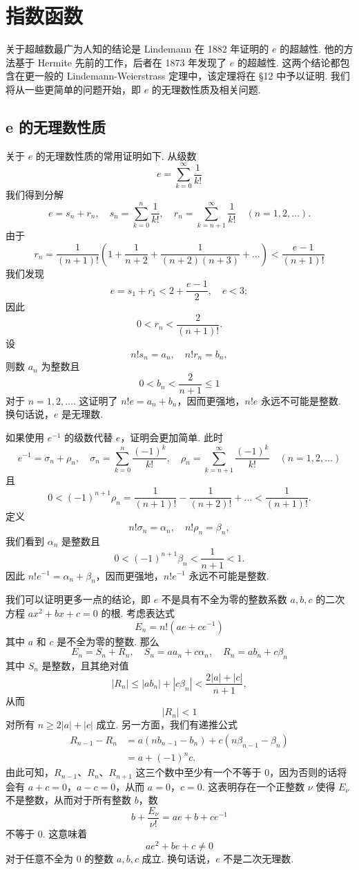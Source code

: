 \chapter{指数函数}

关于超越数最广为人知的结论是 Lindemann 在 1882 年证明的 $e$ 的超越性. 他的方法基于 Hermite 先前的工作，后者在 1873 年发现了 $e$ 的超越性. 这两个结论都包含在更一般的 Lindemann-Weierstrass 定理中，该定理将在 \S 12 中予以证明. 我们将从一些更简单的问题开始，即 $e$ 的无理数性质及相关问题.

\section{e 的无理数性质}

关于 $e$ 的无理数性质的常用证明如下. 从级数
\[ e = \sum_{k=0}^{\infty} \frac{1}{k!} \]
我们得到分解
\[ e = s_n + r_n, \quad s_n = \sum_{k=0}^{n} \frac{1}{k!}, \quad r_n = \sum_{k=n+1}^{\infty} \frac{1}{k!} \quad (n=1, 2, \dots). \]
由于
\[ r_n = \frac{1}{(n+1)!} \left( 1 + \frac{1}{n+2} + \frac{1}{(n+2)(n+3)} + \dots \right) < \frac{e-1}{(n+1)!} \]
我们发现
\[ e = s_1 + r_1 < 2 + \frac{e-1}{2}, \quad e < 3; \]
因此
\[ 0 < r_n < \frac{2}{(n+1)!}. \]
设
\[ n! s_n = a_n, \quad n! r_n = b_n, \]
则数 $a_n$ 为整数且
\[ 0 < b_n < \frac{2}{n+1} \le 1 \]
对于 $n=1, 2, \dots$. 这证明了 $n! e = a_n + b_n$，因而更强地，$n! e$ 永远不可能是整数. 换句话说，$e$ 是无理数.

如果使用 $e^{-1}$ 的级数代替 $e$，证明会更加简单. 此时
\[ e^{-1} = \sigma_n + \rho_n, \quad \sigma_n = \sum_{k=0}^{n} \frac{(-1)^k}{k!}, \quad \rho_n = \sum_{k=n+1}^{\infty} \frac{(-1)^k}{k!} \quad (n=1, 2, \dots) \]
且
\[ 0 < (-1)^{n+1} \rho_n = \frac{1}{(n+1)!} - \frac{1}{(n+2)!} + \dots < \frac{1}{(n+1)!}. \]
定义
\[ n! \sigma_n = \alpha_n, \quad n! \rho_n = \beta_n, \]
我们看到 $\alpha_n$ 是整数且
\[ 0 < (-1)^{n+1} \beta_n < \frac{1}{n+1} < 1. \]
因此 $n! e^{-1} = \alpha_n + \beta_n$，因而更强地，$n! e^{-1}$ 永远不可能是整数.

我们可以证明更多一点的结论，即 $e$ 不是具有不全为零的整数系数 $a, b, c$ 的二次方程 $ax^2 + bx + c = 0$ 的根. 考虑表达式
\[ E_n = n! (ae + ce^{-1}) \]
其中 $a$ 和 $c$ 是不全为零的整数. 那么
\[ E_n = S_n + R_n, \quad S_n = a a_n + c \alpha_n, \quad R_n = a b_n + c \beta_n \]
其中 $S_n$ 是整数，且其绝对值
\[ |R_n| \leq |ab_n| + |c\beta_n| < \frac{2|a|+|c|}{n+1}, \]
从而
\[ |R_n| < 1 \]
对所有 $n \ge 2|a|+|c|$ 成立. 另一方面，我们有递推公式
\[ \begin{aligned} R_{n-1} - R_n &= a(nb_{n-1} - b_n) + c(n\beta_{n-1} - \beta_n) \\ &= a + (-1)^{n}c. \end{aligned} \]
由此可知，$R_{n-1}$、$R_n$、$R_{n+1}$ 这三个数中至少有一个不等于 0，因为否则的话将会有 $a+c=0$，$a-c=0$，从而 $a=0$，$c=0$. 这表明存在一个正整数 $\nu$ 使得 $E_{\nu}$ 不是整数，从而对于所有整数 $b$，数
\[ b + \frac{E_{\nu}}{\nu!} = ae + b + ce^{-1} \]
不等于 0. 这意味着
\[ ae^2 + be + c \neq 0 \]
对于任意不全为 0 的整数 $a, b, c$ 成立. 换句话说，$e$ 不是二次无理数.

